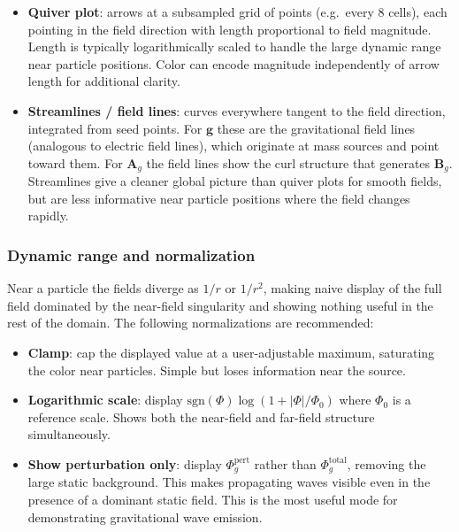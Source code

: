 \documentclass[11pt,a4paper]{article}
\newcommand{\vv}[1]{\mathbf{#1}}
\newcommand{\Phig}{\Phi_g}
\newcommand{\Ag}{\vv{A}_g}
\begin{document}
\begin{itemize}
  \item \textbf{Quiver plot}: arrows at a subsampled grid of points (e.g.\ every 8 cells), each pointing in the field direction with length proportional to field magnitude.  Length is typically logarithmically scaled to handle the large dynamic range near particle positions.  Color can encode magnitude independently of arrow length for additional clarity.

  \item \textbf{Streamlines / field lines}: curves everywhere tangent to the field direction, integrated from seed points.  For $\vv{g}$ these are the gravitational field lines (analogous to electric field lines), which originate at mass sources and point toward them.  For $\Ag$ the field lines show the curl structure that generates $\vv{B}_g$.  Streamlines give a cleaner global picture than quiver plots for smooth fields, but are less informative near particle positions where the field changes rapidly.
\end{itemize}

\subsubsection*{Dynamic range and normalization}

Near a particle the fields diverge as $1/r$ or $1/r^2$, making naive display of the full field dominated by the near-field singularity and showing nothing useful in the rest of the domain.  The following normalizations are recommended:

\begin{itemize}
  \item \textbf{Clamp}: cap the displayed value at a user-adjustable maximum, saturating the color near particles.  Simple but loses information near the source.
  \item \textbf{Logarithmic scale}: display $\mathrm{sgn}(\Phi)\log(1 + |\Phi|/\Phi_0)$ where $\Phi_0$ is a reference scale.  Shows both the near-field and far-field structure simultaneously.
  \item \textbf{Show perturbation only}: display $\Phig^{\mathrm{pert}}$ rather than $\Phig^{\mathrm{total}}$, removing the large static background.  This makes propagating waves visible even in the presence of a dominant static field.  This is the most useful mode for demonstrating gravitational wave emission.
\end{itemize}
\end{document}
